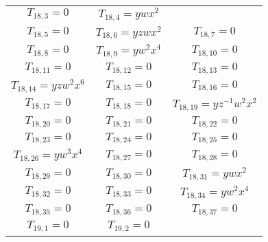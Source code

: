 \begin{longtable}{|c|c|c|}
$T_{18,3}= 0$&

$T_{18,4}= ywx^2$\\

$T_{18,5}= 0$&

$T_{18,6}= yzwx^2$&

$T_{18,7}= 0$\\

$T_{18,8}= 0$&

$T_{18,9}= yw^2x^4$&

$T_{18,10}= 0$\\

$T_{18,11}= 0$&

$T_{18,12}= 0$&

$T_{18,13}= 0$\\

$T_{18,14}= yzw^2x^6$&

$T_{18,15}= 0$&

$T_{18,16}= 0$\\

$T_{18,17}= 0$&

$T_{18,18}= 0$&

$T_{18,19}= yz^{-1}w^2x^2$\\

$T_{18,20}= 0$&

$T_{18,21}= 0$&

$T_{18,22}= 0$\\

$T_{18,23}= 0$&

$T_{18,24}= 0$&

$T_{18,25}= 0$\\

$T_{18,26}= yw^3x^4$&

$T_{18,27}= 0$&

$T_{18,28}= 0$\\

$T_{18,29}= 0$&

$T_{18,30}= 0$&

$T_{18,31}= ywx^2$\\

$T_{18,32}= 0$&

$T_{18,33}= 0$&

$T_{18,34}= yw^2x^4$\\

$T_{18,35}= 0$&

$T_{18,36}= 0$&

$T_{18,37}= 0$\\

$T_{19,1}= 0$&

$T_{19,2}= 0$&


\end{longtable}
